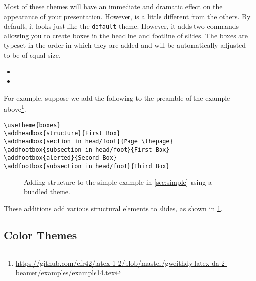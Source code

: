 \normalfont
Most of these themes will have an immediate and dramatic effect on the appearance of your presentation.
However,  is a little different from the others.
By default, it looks just like the \texttt{default} theme.
However, it adds two commands allowing you to create boxes in the headline and footline of slides.
The boxes are typeset in the order in which they are added and will be automatically adjusted to be of equal size.
\begin{itemize}
  \item {}
  \item {}
\end{itemize}
For example, suppose we add the following to the preamble of the example above\footnote{\url{https://github.com/cfr42/latex-1-2/blob/master/gweithdy-latex-da-2-beamer/examples/example14.tex}}.
\begin{verbatim}
\usetheme{boxes}
\addheadbox{structure}{First Box}
\addheadbox{section in head/foot}{Page \thepage}
\addfootbox{subsection in head/foot}{First Box}
\addfootbox{alerted}{Second Box}
\addfootbox{subsection in head/foot}{Third Box}
\end{verbatim}
\begin{figure}
  \centering
  \par
  \caption{Adding structure to the simple example in \ref{sec:simple} using a bundled theme.}\label{fig:theme-boxes}
\end{figure}
These additions add various structural elements to slides, as shown in \cref{fig:theme-boxes}.


\subsection{Color Themes}\label{subsec:color-themes}

